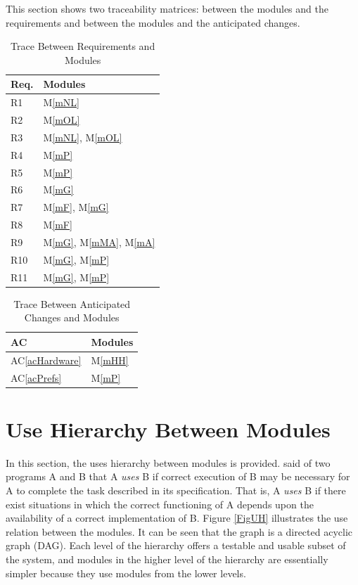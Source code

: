\documentclass[12pt, titlepage]{article}
\newcommand{\acref}[1]{AC\ref{#1}}
\newcommand{\mref}[1]{M\ref{#1}}
\begin{document}
This section shows two traceability matrices: between the modules and the
requirements and between the modules and the anticipated changes.

\begin{table}[H]
\centering
\begin{tabular}{p{} p{}}
\toprule
\textbf{Req.} & \textbf{Modules}\\
\midrule
R1 & \mref{mNL}\\
R2 & \mref{mOL}\\
R3 & \mref{mNL}, \mref{mOL}\\
R4 & \mref{mP}\\
R5 & \mref{mP}\\
R6 & \mref{mG}\\
R7 & \mref{mF}, \mref{mG}\\
R8 & \mref{mF}\\
R9 & \mref{mG}, \mref{mMA}, \mref{mA}\\
R10 & \mref{mG}, \mref{mP}\\
R11 & \mref{mG}, \mref{mP}\\
\bottomrule
\end{tabular}
\caption{Trace Between Requirements and Modules}
\label{TblRT}
\end{table}

\begin{table}[H]
\centering
\begin{tabular}{p{} p{}}
\toprule
\textbf{AC} & \textbf{Modules}\\
\midrule
\acref{acHardware} & \mref{mHH}\\
\acref{acPrefs} & \mref{mP}\\
\bottomrule
\end{tabular}
\caption{Trace Between Anticipated Changes and Modules}
\label{TblACT}
\end{table}

\section{Use Hierarchy Between Modules} \label{SecUse}

In this section, the uses hierarchy between modules is
provided. \citet{Parnas1978} said of two programs A and B that A {\em uses} B if
correct execution of B may be necessary for A to complete the task described in
its specification. That is, A {\em uses} B if there exist situations in which
the correct functioning of A depends upon the availability of a correct
implementation of B.  Figure \ref{FigUH} illustrates the use relation between
the modules. It can be seen that the graph is a directed acyclic graph
(DAG). Each level of the hierarchy offers a testable and usable subset of the
system, and modules in the higher level of the hierarchy are essentially simpler
because they use modules from the lower levels.
\end{document}
